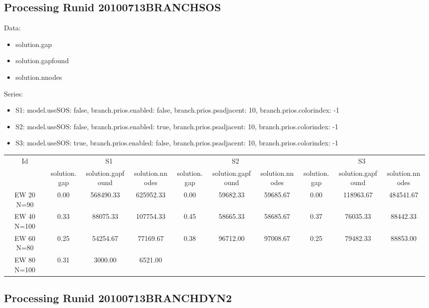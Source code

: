 \documentclass[landscape, 12pt]{report}
\begin{document}
\subsection{Processing Runid 20100713BRANCHSOS}
Data:
\begin{itemize}
\item solution.gap
\item solution.gapfound
\item solution.nnodes
\end{itemize}
Series:
\begin{itemize}
\item S1: model.useSOS: false, branch.prios.enabled: false, branch.prios.psadjacent: 10, branch.prios.colorindex: -1
\item S2: model.useSOS: false, branch.prios.enabled: true, branch.prios.psadjacent: 10, branch.prios.colorindex: -1
\item S3: model.useSOS: true, branch.prios.enabled: false, branch.prios.psadjacent: 10, branch.prios.colorindex: -1
\end{itemize}
\begin{tabular}{|c|ccc|ccc|ccc|}
\hline
\multicolumn{1}{|c|}{Id} & \multicolumn{3}{|c|}{S1} & \multicolumn{3}{|c|}{S2} & \multicolumn{3}{|c|}{S3}
\\
 & solution.gap & solution.gapfound & solution.nnodes & solution.gap & solution.gapfound & solution.nnodes & solution.gap & solution.gapfound & solution.nnodes
\\
\hline
EW 20 N=90 & 0.00 & 568490.33 & 625952.33 & 0.00 & 59682.33 & 59685.67 & 0.00 & 118963.67 & 484541.67
\\
EW 40 N=100 & 0.33 & 88075.33 & 107754.33 & 0.45 & 58665.33 & 58685.67 & 0.37 & 76035.33 & 88442.33
\\
EW 60 N=80 & 0.25 & 54254.67 & 77169.67 & 0.38 & 96712.00 & 97008.67 & 0.25 & 79482.33 & 88853.00
\\
EW 80 N=100 & 0.31 & 3000.00 & 6521.00
\\
\hline 
 \end{tabular}


\clearpage
	
	\subsection{Processing Runid 20100713BRANCHDYN2}
\end{document}
